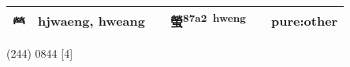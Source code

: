\documentclass[14pt,a4paper]{scrartcl}
\begin{document}
\begin{longtable}[c]{@{}llllll@{}}
\begin{minipage}[t]{0.14\columnwidth}\raggedright\strut
𤇾
\strut\end{minipage} &
\begin{minipage}[t]{0.14\columnwidth}\raggedright\strut
hjwaeng, hweang
\strut\end{minipage} &
\begin{minipage}[t]{0.14\columnwidth}\raggedright\strut
\strut\end{minipage} &
\begin{minipage}[t]{0.14\columnwidth}\raggedright\strut
螢\textsuperscript{87a2~hweng}
\strut\end{minipage} &
\begin{minipage}[t]{0.14\columnwidth}\raggedright\strut
\strut\end{minipage} &
\begin{minipage}[t]{0.14\columnwidth}\raggedright\strut
pure:other
\strut\end{minipage}\tabularnewline
\bottomrule
\end{longtable}

(244) 0844 {[}4{]}
\end{document}
